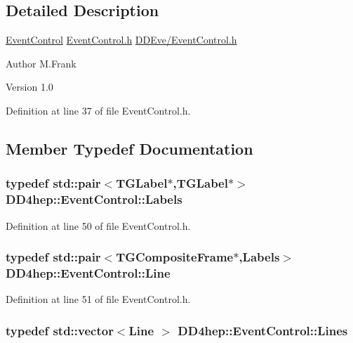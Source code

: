 \subsection{Detailed Description}
\hyperlink{class_d_d4hep_1_1_event_control}{EventControl} \hyperlink{_event_control_8h}{EventControl.h} \hyperlink{_event_control_8h}{DDEve/EventControl.h}

\begin{DoxyAuthor}{Author}
M.Frank 
\end{DoxyAuthor}
\begin{DoxyVersion}{Version}
1.0 
\end{DoxyVersion}


Definition at line 37 of file EventControl.h.

\subsection{Member Typedef Documentation}
\hypertarget{class_d_d4hep_1_1_event_control_a12b653cc77607d8916f8a5ec009036ed}{
\subsubsection[{Labels}]{\setlength{\rightskip}{0pt plus 5cm}typedef std::pair$<$TGLabel$\ast$,TGLabel$\ast$$>$ {\bf DD4hep::EventControl::Labels}}}
\label{class_d_d4hep_1_1_event_control_a12b653cc77607d8916f8a5ec009036ed}


Definition at line 50 of file EventControl.h.\hypertarget{class_d_d4hep_1_1_event_control_a8195e2f8755ede7627abeaaacd0155e2}{
\subsubsection[{Line}]{\setlength{\rightskip}{0pt plus 5cm}typedef std::pair$<$TGCompositeFrame$\ast$,{\bf Labels}$>$ {\bf DD4hep::EventControl::Line}}}
\label{class_d_d4hep_1_1_event_control_a8195e2f8755ede7627abeaaacd0155e2}


Definition at line 51 of file EventControl.h.\hypertarget{class_d_d4hep_1_1_event_control_a662fec8b3e1e89af1cf704e41cb7df78}{
\subsubsection[{Lines}]{\setlength{\rightskip}{0pt plus 5cm}typedef std::vector$<${\bf Line} $>$ {\bf DD4hep::EventControl::Lines}}}
\label{class_d_d4hep_1_1_event_control_a662fec8b3e1e89af1cf704e41cb7df78}


